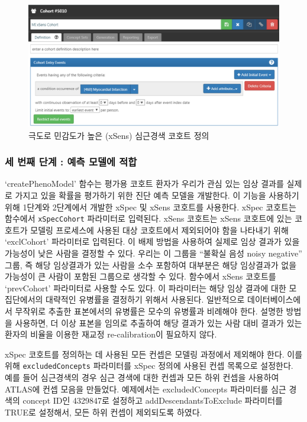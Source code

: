 \documentclass[10.5pt]{book}
\theoremstyle{definition}
\theoremstyle{definition}
\theoremstyle{definition}
\theoremstyle{remark}
\begin{document}
\begin{figure}

{\centering \includegraphics[width=1\linewidth]{images/ClinicalValidity/xSens} 

}

\caption{극도로 민감도가 높은 (xSens) 심근경색 코호트 정의}\label{fig:xSens}
\end{figure}

\subsubsection*{세 번째 단계 : 예측 모델에 적합}\label{-----}

`createPhenoModel' 함수는 평가용 코호트 환자가 우리가 관심 있는 임상
결과를 실제로 가지고 있을 확률을 평가하기 위한 진단 예측 모델을
개발한다. 이 기능을 사용하기 위해 1단계와 2단계에서 개발한 xSpec 및
xSens 코호트를 사용한다. xSpec 코호트는 함수에서 \texttt{xSpecCohort}
파라미터로 입력된다. xSens 코호트는 xSens 코호트에 있는 코호트가 모델링
프로세스에 사용된 대상 코호트에서 제외되어야 함을 나타내기 위해
`exclCohort' 파라미터로 입력된다. 이 배제 방법을 사용하여 실제로 임상
결과가 있을 가능성이 낮은 사람을 결정할 수 있다. 우리는 이 그룹을
``불확실 음성 noisy negative'' 그룹, 즉 해당 임상결과가 있는 사람을 소수
포함하여 대부분은 해당 임상결과가 없을 가능성이 큰 사람이 포함된
그룹으로 생각할 수 있다. 함수에서 xSens 코호트를 `prevCohort' 파라미터로
사용할 수도 있다. 이 파라미터는 해당 임상 결과에 대한 모집단에서의
대략적인 유병률을 결정하기 위해서 사용된다. 일반적으로 데이터베이스에서
무작위로 추출한 표본에서의 유병률은 모수의 유병률과 비례해야 한다.
설명한 방법을 사용하면, 더 이상 표본을 임의로 추출하여 해당 결과가 있는
사람 대비 결과가 있는 환자의 비율을 이용한 재교정 re-calibration이
필요하지 않다.

xSpec 코호트를 정의하는 데 사용된 모든 컨셉은 모델링 과정에서 제외해야
한다. 이를 위해 \texttt{excludedConcepts} 파라미터를 xSpec 정의에 사용된
컨셉 목록으로 설정한다. 예를 들어 심근경색의 경우 심근 경색에 대한
컨셉과 모든 하위 컨셉을 사용하여 ATLAS에 컨셉 모음을 만들었다.
예제에서는 excludedConcepts 파라미터를 심근 경색의 concept ID인
4329847로 설정하고 addDescendantsToExclude 파라미터를 TRUE로 설정해서,
모든 하위 컨셉이 제외되도록 하였다.
\end{document}
